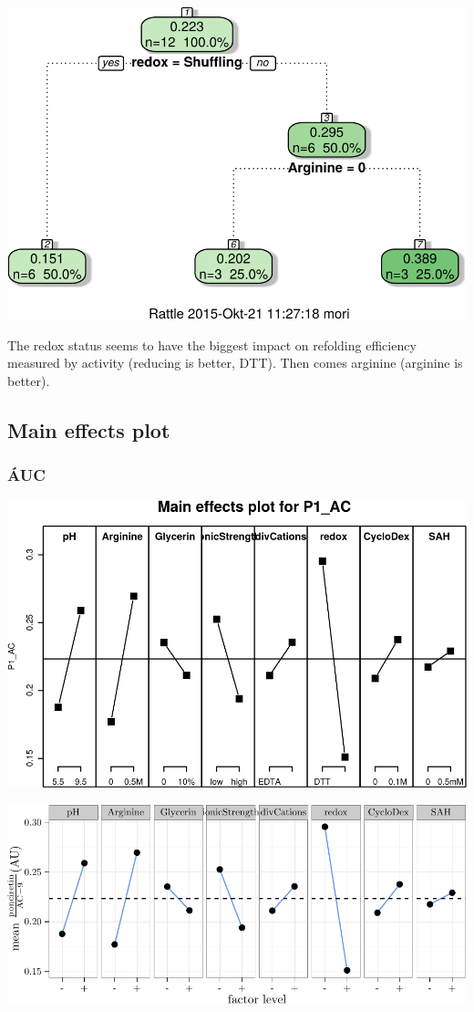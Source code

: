 \documentclass[]{article}
\begin{document}
\includegraphics{analysis_files/figure-latex/unnamed-chunk-8-1.pdf}

The redox status seems to have the biggest impact on refolding
efficiency measured by activity (reducing is better, DTT). Then comes
arginine (arginine is better).

\subsection{Main effects plot}\label{main-effects-plot-1}

\subsubsection{ÁUC}\label{auc}

\includegraphics{analysis_files/figure-latex/unnamed-chunk-9-1.pdf}

\includegraphics{analysis_files/figure-latex/unnamed-chunk-10-1.pdf}
\end{document}
